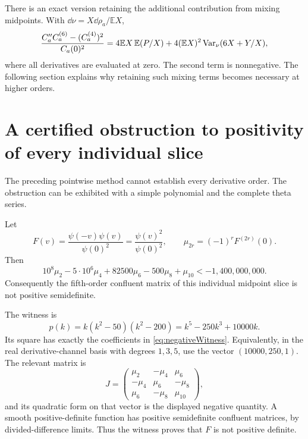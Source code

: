 There is an exact version retaining the additional contribution from mixing midpoints. With $\dd\nu=X\dd\rho_a/\mathbb EX$,
\begin{equation}\label{eq:sixthCovariance}
\frac{C_a''C_a^{(6)}-(C_a^{(4)})^2}{C_a(0)^2}
=4\mathbb EX\,\mathbb E(P/X)
+4(\mathbb EX)^2\operatorname{Var}_\nu(6X+Y/X),
\end{equation}
where all derivatives are evaluated at zero. The second term is nonnegative. The following section explains why retaining such mixing terms becomes necessary at higher orders.

\section{A certified obstruction to positivity of every individual slice}
The preceding pointwise method cannot establish every derivative order. The obstruction can be exhibited with a simple polynomial and the complete theta series.

\begin{theorem}\label{thm:negativeSlice}
Let
\[
F(v)=\frac{\psi(-v)\psi(v)}{\psi(0)^2}=\frac{\psi(v)^2}{\psi(0)^2},
\qquad \mu_{2r}=(-1)^rF^{(2r)}(0).
\]
Then
\begin{equation}\label{eq:negativeWitness}
\boxed{10^8\mu_2-5\cdot10^6\mu_4+82500\mu_6-500\mu_8+\mu_{10}
<-1{,}400{,}000{,}000.}
\end{equation}
Consequently the fifth-order confluent matrix of this individual midpoint slice is not positive semidefinite.
\end{theorem}

The witness is
\begin{equation}\label{eq:witnessPolynomial}
p(k)=k(k^2-50)(k^2-200)=k^5-250k^3+10000k.
\end{equation}
Its square has exactly the coefficients in \eqref{eq:negativeWitness}. Equivalently, in the real derivative-channel basis with degrees $1,3,5$, use the vector $(10000,250,1)$. The relevant matrix is
\[
J=\begin{pmatrix}
\mu_2&-\mu_4&\mu_6\\
-\mu_4&\mu_6&-\mu_8\\
\mu_6&-\mu_8&\mu_{10}
\end{pmatrix},
\]
and its quadratic form on that vector is the displayed negative quantity. A smooth positive-definite function has positive semidefinite confluent matrices, by divided-difference limits. Thus the witness proves that $F$ is not positive definite.

